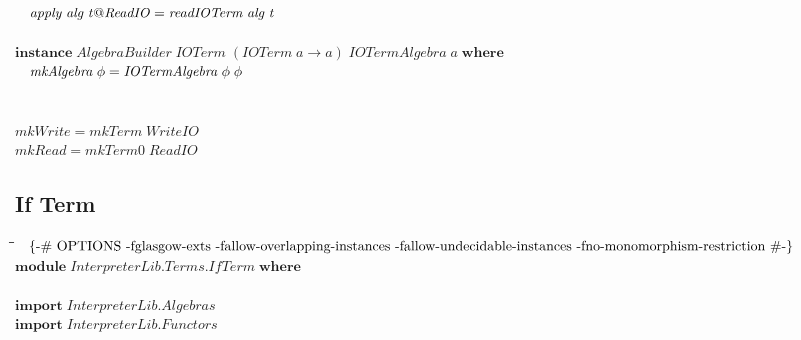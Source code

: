 \documentclass[10pt]{article}
\newlength{\lwidth}\setlength{\lwidth}{4.5cm}
\newlength{\cwidth}\setlength{\cwidth}{8mm} %
\newcommand{\Conid}[1]{\mathit{#1}}
\newcommand{\Varid}[1]{\mathit{#1}}
\begin{document}
\begin{tabbing}
${\hskip1.00em\relax\Varid{apply}\;\Varid{alg}\;\Varid{t}\mathord{@}\Conid{ReadIO}\mathrel{=}\Varid{readIOTerm}\;\Varid{alg}\;\Varid{t}}$\\
${}$\\
${\mathbf{instance}\;\Conid{AlgebraBuilder}\;\Conid{IOTerm}\;(\Conid{IOTerm}\;\Varid{a}\to \Varid{a})\;\Conid{IOTermAlgebra}\;\Varid{a}\;\mathbf{where}}$\\
${\hskip1.00em\relax\Varid{mkAlgebra}\;\Varid{\phi}\mathrel{=}\Conid{IOTermAlgebra}\;\Varid{\phi}\;\Varid{\phi}}$\\
${}$\\
${}$\\
${\Varid{mkWrite}\mathrel{=}\Varid{mkTerm}\;\Conid{WriteIO}}$\\
${\Varid{mkRead}\mathrel{=}\Varid{mkTerm0}\;\Conid{ReadIO}}$
\end{tabbing}
\subsection{If Term}
\begin{tabbing}
\qquad\=\hspace{\lwidth}\=\hspace{\cwidth}\=\+\kill
${\mbox{\enskip\{-\# OPTIONS -fglasgow-exts -fallow-overlapping-instances -fallow-undecidable-instances -fno-monomorphism-restriction  \#-\}\enskip}}$\\
${\mathbf{module}\;\Conid{\Conid{InterpreterLib}.\Conid{Terms}.IfTerm}\;\mathbf{where}}$\\
${}$\\
${\mathbf{import}\;\Conid{\Conid{InterpreterLib}.Algebras}}$\\
${\mathbf{import}\;\Conid{\Conid{InterpreterLib}.Functors}}$
\end{tabbing}
\end{document}
